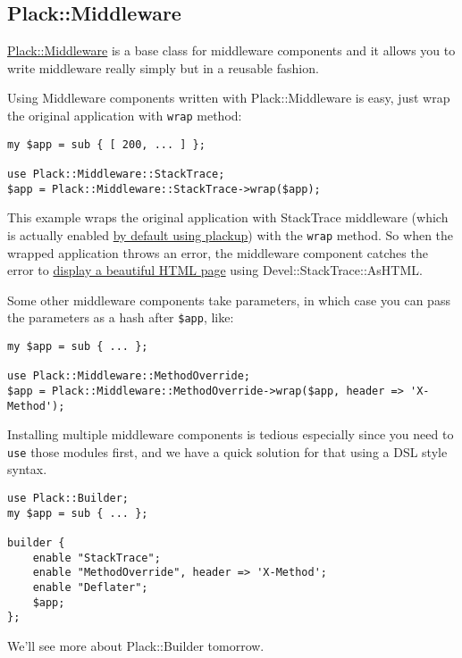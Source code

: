 \subsection{Plack::Middleware}\label{plackmiddleware}

\href{http://search.cpan.org/perldoc?Plack::Middleware}{Plack::Middleware}
is a base class for middleware components and it allows you to write
middleware really simply but in a reusable fashion.

Using Middleware components written with Plack::Middleware is easy, just
wrap the original application with \lstinline!wrap! method:

\begin{lstlisting}
my $app = sub { [ 200, ... ] };

use Plack::Middleware::StackTrace;
$app = Plack::Middleware::StackTrace->wrap($app);
\end{lstlisting}

This example wraps the original application with StackTrace middleware
(which is actually enabled
\href{http://advent.plackperl.org/2009/12/day-3-using-plackup.html}{by
default using plackup}) with the \lstinline!wrap! method. So when the
wrapped application throws an error, the middleware component catches
the error to
\href{http://bulknews.typepad.com/blog/2009/10/develstacktraceashtml.html}{display
a beautiful HTML page} using Devel::StackTrace::AsHTML.

Some other middleware components take parameters, in which case you can
pass the parameters as a hash after \lstinline!$app!, like:

\begin{lstlisting}
my $app = sub { ... };

use Plack::Middleware::MethodOverride;
$app = Plack::Middleware::MethodOverride->wrap($app, header => 'X-Method');
\end{lstlisting}

Installing multiple middleware components is tedious especially since
you need to \lstinline!use! those modules first, and we have a quick
solution for that using a DSL style syntax.

\begin{lstlisting}
use Plack::Builder;
my $app = sub { ... };

builder {
    enable "StackTrace";
    enable "MethodOverride", header => 'X-Method';
    enable "Deflater";
    $app;
};
\end{lstlisting}

We'll see more about Plack::Builder tomorrow.


